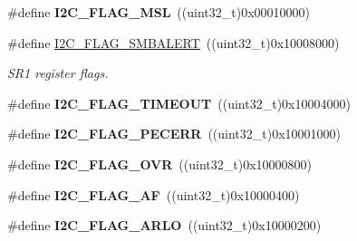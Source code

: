 \begin{DoxyCompactItemize}
\item 
\hypertarget{group___i2_c__flags__definition_gae8e6a404cbfd70420d278d520304f368}{}\#define {\bfseries I2\+C\+\_\+\+F\+L\+A\+G\+\_\+\+M\+S\+L}~((uint32\+\_\+t)0x00010000)\label{group___i2_c__flags__definition_gae8e6a404cbfd70420d278d520304f368}

\item 
\hypertarget{group___i2_c__flags__definition_ga4e1d7cd1574d03ba501c27483300c1be}{}\#define \hyperlink{group___i2_c__flags__definition_ga4e1d7cd1574d03ba501c27483300c1be}{I2\+C\+\_\+\+F\+L\+A\+G\+\_\+\+S\+M\+B\+A\+L\+E\+R\+T}~((uint32\+\_\+t)0x10008000)\label{group___i2_c__flags__definition_ga4e1d7cd1574d03ba501c27483300c1be}

\begin{DoxyCompactList}\small\item\em S\+R1 register flags. \end{DoxyCompactList}\item 
\hypertarget{group___i2_c__flags__definition_ga89c8d5d8ccc77a8619fafe9b39d1cc74}{}\#define {\bfseries I2\+C\+\_\+\+F\+L\+A\+G\+\_\+\+T\+I\+M\+E\+O\+U\+T}~((uint32\+\_\+t)0x10004000)\label{group___i2_c__flags__definition_ga89c8d5d8ccc77a8619fafe9b39d1cc74}

\item 
\hypertarget{group___i2_c__flags__definition_ga6c7addb6413f165f42bcc87506ea8467}{}\#define {\bfseries I2\+C\+\_\+\+F\+L\+A\+G\+\_\+\+P\+E\+C\+E\+R\+R}~((uint32\+\_\+t)0x10001000)\label{group___i2_c__flags__definition_ga6c7addb6413f165f42bcc87506ea8467}

\item 
\hypertarget{group___i2_c__flags__definition_gab579673c8ac920db199aa7f18e547fb3}{}\#define {\bfseries I2\+C\+\_\+\+F\+L\+A\+G\+\_\+\+O\+V\+R}~((uint32\+\_\+t)0x10000800)\label{group___i2_c__flags__definition_gab579673c8ac920db199aa7f18e547fb3}

\item 
\hypertarget{group___i2_c__flags__definition_ga2f89dbba9b964e6ade1480705e7a97d4}{}\#define {\bfseries I2\+C\+\_\+\+F\+L\+A\+G\+\_\+\+A\+F}~((uint32\+\_\+t)0x10000400)\label{group___i2_c__flags__definition_ga2f89dbba9b964e6ade1480705e7a97d4}

\item 
\hypertarget{group___i2_c__flags__definition_gae1e67936f4780e42b8bbe04ac9c20a7b}{}\#define {\bfseries I2\+C\+\_\+\+F\+L\+A\+G\+\_\+\+A\+R\+L\+O}~((uint32\+\_\+t)0x10000200)\label{group___i2_c__flags__definition_gae1e67936f4780e42b8bbe04ac9c20a7b}


\end{DoxyCompactItemize}
